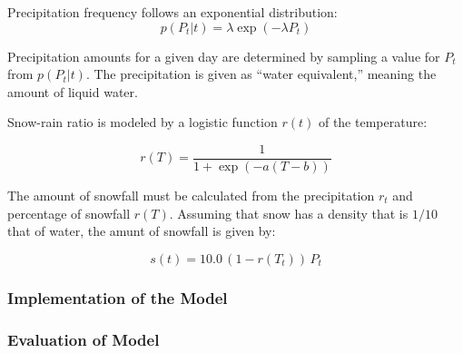 \documentclass[11pt, letterpaper]{article}
\begin{document}
Precipitation frequency follows an exponential distribution:
\begin{equation}
p(P_t | t) = \lambda \exp(-\lambda P_t)
\end{equation}

Precipitation amounts for a given day are determined by sampling a value for $P_t$ from $p(P_t | t)$.  The precipitation is given as ``water equivalent,'' meaning the amount of liquid water.

Snow-rain ratio is modeled by a logistic function $r(t)$ of the temperature:

\begin{equation}
r(T) = \frac{1}{1 + \exp(-a (T - b))}
\end{equation}

The amount of snowfall must be calculated from the precipitation $r_t$ and percentage of snowfall $r(T)$.  Assuming that snow has a density that is $1/10$ that of water, the amunt of snowfall is given by:

\begin{equation}
s(t) = 10.0 \, (1 - r(T_t)) \, P_t
\end{equation}

\subsubsection{Implementation of the Model}

\subsubsection{Evaluation of Model}
\end{document}

